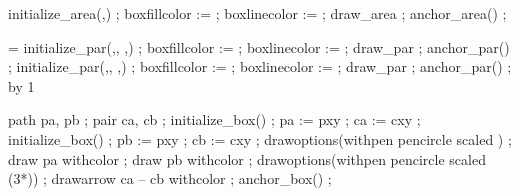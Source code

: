   initialize_area(,) ;
  boxfillcolor :=  ;
  boxlinecolor :=  ;
  draw_area ;
  anchor_area() ;
\stopMPpositiongraphic


  \ifnum{}=\relax
      initialize_par(,,
                     ,) ;
      boxfillcolor :=  ;
      boxlinecolor :=  ;
      draw_par ;
      anchor_par() ;
    \stopMPpositiongraphic
  \else
      initialize_par(,,
                     ,) ;
      boxfillcolor :=  ;
      boxlinecolor :=  ;
      draw_par ;
      anchor_par() ;
    \stopMPpositiongraphic
    \advance\realpageno by 1
      {%
       }%
  \fi
\stopMPpositionmethod



  path pa, pb ; pair ca, cb ;
  initialize_box() ; pa := pxy ; ca := cxy ;
  initialize_box() ; pb := pxy ; cb := cxy ;
  drawoptions(withpen pencircle scaled ) ;
  draw pa withcolor  ;
  draw pb withcolor  ;
  drawoptions(withpen pencircle scaled (3*)) ;
  drawarrow ca -- cb withcolor  ;
  anchor_box() ;
\stopMPpositiongraphic


